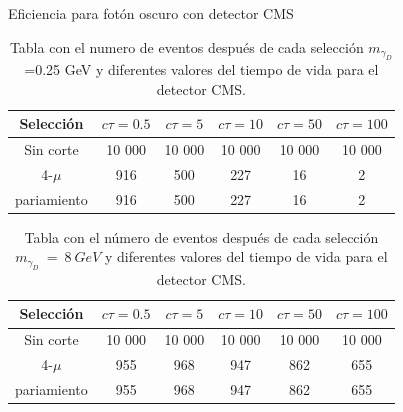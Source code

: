 \begin{frame}{Eficiencia para fot\'on oscuro con detector CMS}
\begin{small}
\begin{table}[]
\centering
\begin{tabular}{c|c|c|c|c|c|}
Selecci\'on  & $c\tau=0.5$ & $c\tau=5$ & $c\tau=10$ & $c\tau=50$ & $c\tau=100$ \\  \hline
Sin corte    &  10 000 & 10 000 & 10 000 & 10 000 & 10 000\\
4-$\mu$      &  916 & 500 & 227 & 16 & 2 \\
pariamiento  &  916 & 500 & 227 & 16 & 2
\end{tabular}
\caption{Tabla con el numero de eventos despu\'es de cada selecci\'on $m_{\gamma_{D}}$=0.25 GeV y diferentes valores del tiempo de vida para el detector CMS.}
\end{table}

\begin{table}[h]
\centering
\begin{tabular}{c|c|c|c|c|c|}
Selecci\'on  & $c\tau=0.5$ & $c\tau=5$ & $c\tau=10$ & $c\tau=50$ & $c\tau=100$ \\ \hline
Sin corte   & 10 000 & 10 000 & 10 000 & 10 000 & 10 000\\
4-$\mu$     & 955 & 968 & 947 & 862 & 655 \\
pariamiento & 955 & 968 & 947 & 862 & 655
\end{tabular}
\caption{Tabla con el n\'umero de eventos despu\'es de cada selecci\'on $m_{\gamma_{D}}~=~ 8~GeV$ y diferentes valores del tiempo de vida para el detector CMS.}
\end{table}

\end{small}

\end{frame}



